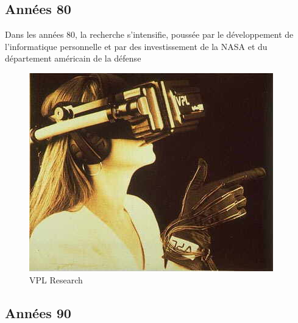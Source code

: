 \documentclass[a4,12pt]{scrartcl}
\begin{document}
\subsection{Années 80}

Dans les années 80, la recherche s'intensifie, poussée par le développement de l’informatique personnelle et  par des investissement de la NASA et du département américain de la défense \cite{theverge14}

\begin{figure}[H]
	\centering
	\includegraphics[width=0.6\linewidth]{vpl-hmd}
	\caption{VPL Research}
\end{figure}



\subsection{Années 90}
\end{document}
